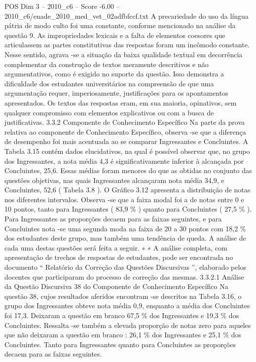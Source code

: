 \begin{textsample}{POS Dim 3 – 2010\_c6 – Score -6.00 – 2010\_c6/enade\_2010\_med\_vet\_02adfbfccf.txt}
A precariedade do uso da língua pátria de modo culto foi uma constante, conforme mencionado na análise da questão 9.
As impropriedades lexicais e a falta de elementos coesores que articulassem as partes constitutivas das respostas foram um incômodo constante.
Nesse sentido, agrava -se a situação da baixa qualidade textual em decorrência complementar da construção de textos meramente descritivos e não argumentativos, como é exigido no suporte da questão.
Isso demonstra a dificuldade dos estudantes universitários na compreensão de que uma argumentação requer, imperiosamente, justificações para os apontamentos apresentados.
Os textos das respostas eram, em sua maioria, opinativos, sem qualquer compromisso com elementos explicativos ou com a busca de justificativas. 3.3.2 Componente de Conhecimento Específico Na parte da prova relativa ao componente de Conhecimento Específico, observa -se que a diferença de desempenho foi mais acentuada ao se comparar Ingressantes e Concluintes.
A Tabela 3.15 contém dados elucidativos, na qual é possível observar que, no grupo dos Ingressantes, a nota média 4,3 é significativamente inferior à alcançada por Concluintes, 25,6.
Essas médias foram menores do que as obtidas no conjunto das questões objetivas, nas quais Ingressantes alcançaram nota média 34,9, e Concluintes, 52,6 ( Tabela 3.8 ).
O Gráfico 3.12 apresenta a distribuição de notas nos diferentes intervalos.
Observa -se que a faixa modal foi a de notas entre 0 e 10 pontos, tanto para Ingressantes ( 83,9 \% ) quanto para Concluintes ( 27,5 \% ).
Para Ingressantes as proporções decaem para as faixas seguintes, e para Concluintes nota -se uma segunda moda na faixa de 20 a 30 pontos com 18,2 \% dos estudantes deste grupo, mas também uma tendência de queda.
A análise de cada uma destas questões será feita a seguir. ∗ ∗ A análise completa, com apresentação de trechos de respostas de estudantes, pode ser encontrada no documento “ Relatório da Correção das Questões Discursivas ”, elaborado pelos docentes que participaram do processo de correção das mesmas. 3.3.2.1 Análise da Questão Discursiva 38 do Componente de Conhecimento Específico Na questão 38, cujos resultados aferidos encontram -se descritos na Tabela 3.16, o grupo dos Ingressantes obteve nota média 0,9, enquanto a média dos Concluintes foi 17,3.
Deixaram a questão em branco 67,5 \% dos Ingressantes e 19,3 \% dos Concluintes.
Ressalta -se também a elevada proporção de notas zero para aqueles que não deixaram a questão em branco : 26,1 \% dos Ingressantes e 25,1 \% dos Concluintes.
Tanto para Ingressantes quanto para Concluintes as proporções decaem para as faixas seguintes.

\end{textsample}
